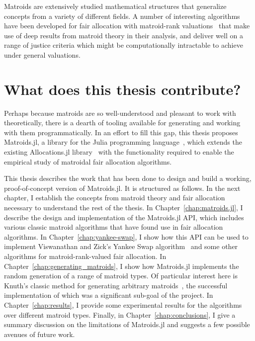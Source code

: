 Matroids are extensively studied mathematical structures that generalize concepts from a variety of different fields. A number of interesting algorithms have been developed for fair allocation with matroid-rank valuations~\cite{barman2020fair,barman2021existence,Benabbou_2020,benabbou-2021,viswanathan2023yankee} that make use of deep results from matroid theory in their analysis, and deliver well on a range of justice criteria which might be computationally intractable to achieve under general valuations. 

\section*{What does this thesis contribute?}
Perhaps because matroids are so well-understood and pleasant to work with theoretically, there is a dearth of tooling available for generating and working with them programmatically. In an effort to fill this gap, this thesis proposes Matroids.jl, a library for the Julia programming language~\cite{bezanson2017julia}, which extends the existing Allocations.jl library~\cite{Hetland_Allocations_jl_2022} with the functionality required to enable the empirical study of matroidal fair allocation algorithms. 

This thesis describes the work that has been done to design and build a working, proof-of-concept version of Matroids.jl. It is structured as follows. In the next chapter, I establish the concepts from matroid theory and fair allocation necessary to understand the rest of the thesis. In Chapter~\ref{chap:matroids.jl}, I describe the design and implementation of the Matroids.jl API, which includes various classic matroid algorithms that have found use in fair allocation algorithms. In Chapter~\ref{chap:yankee-swap}, I show how this API can be used to implement Viswanathan and Zick's Yankee Swap algorithm~\cite{viswanathan2023yankee} and some other algorithms for matroid-rank-valued fair allocation. In Chapter~\ref{chap:generating_matroids}, I show how Matroids.jl implements the random generation of a range of matroid types. Of particular interest here is Knuth's classic method for generating arbitrary matroids~\cite{knuth-1975}, the successful implementation of which was a significant sub-goal of the project. In Chapter~\ref{chap:results}, I provide some experimental results for the algorithms over different matroid types. Finally, in Chapter~\ref{chap:conclusions}, I give a summary discussion on the limitations of Matroids.jl and suggests a few possible avenues of future work.
